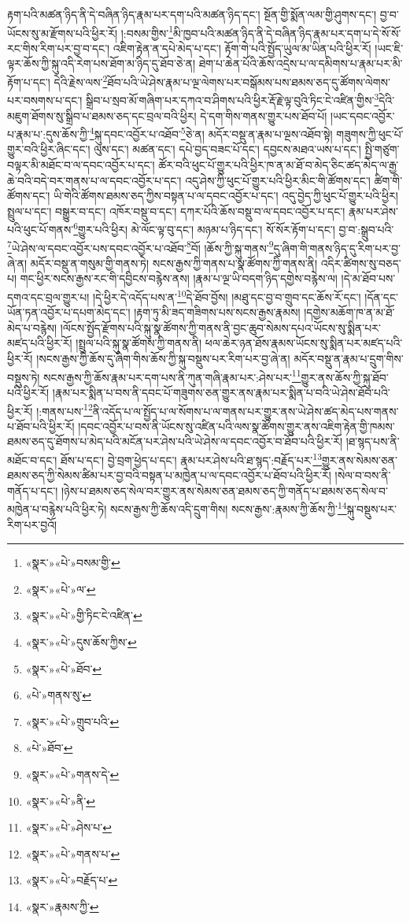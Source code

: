 རྟག་པའི་མཚན་ཉིད་ནི་དེ་བཞིན་ཉིད་རྣམ་པར་དག་པའི་མཚན་ཉིད་དང་། སྔོན་གྱི་སྨོན་ལམ་གྱི་ཤུགས་དང་། བྱ་བ་ཡོངས་སུ་མ་རྫོགས་པའི་ཕྱིར་རོ། །:བསམ་གྱིས་\footnote{«སྣར་»«པེ་»བསམ་གྱི་}མི་ཁྱབ་པའི་མཚན་ཉིད་ནི་དེ་བཞིན་ཉིད་རྣམ་པར་དག་པ་དེ་སོ་སོ་རང་གིས་རིག་པར་བྱ་བ་དང་། འཇིག་རྟེན་ན་དཔེ་མེད་པ་དང་། རྟོག་གེ་པའི་སྤྱོད་ཡུལ་མ་ཡིན་པའི་ཕྱིར་རོ། །ཡང་ཇི་ལྟར་ཆོས་ཀྱི་སྐུ་འདི་རེག་པས་ཐོག་མ་ཉིད་དུ་ཐོབ་ཅེ་ན། ཐེག་པ་ཆེན་པོའི་ཆོས་འདྲེས་པ་ལ་དམིགས་པ་རྣམ་པར་མི་རྟོག་པ་དང་། དེའི་རྗེས་ལས་\footnote{«སྣར་»«པེ་»ལ་}ཐོབ་པའི་ཡེ་ཤེས་རྣམ་པ་ལྔ་ལེགས་པར་བསྒོམས་པས་ཐམས་ཅད་དུ་ཚོགས་ལེགས་པར་བསགས་པ་དང་། སྒྲིབ་པ་སྲབ་མོ་གཞིག་པར་དཀའ་བ་ཤིགས་པའི་ཕྱིར་རྡོ་རྗེ་ལྟ་བུའི་ཏིང་ངེ་འཛིན་གྱིས་\footnote{«སྣར་»«པེ་»གྱི་ཏིང་ངེ་འཛིན་}དེའི་མཇུག་ཐོགས་སུ་སྒྲིབ་པ་ཐམས་ཅད་དང་བྲལ་བའི་ཕྱིར། དེ་དག་གིས་གནས་གྱུར་པས་ཐོབ་པོ། །ཡང་དབང་འབྱོར་པ་རྣམ་པ་:དུས་ཆོས་ཀྱི་\footnote{«སྣར་»«པེ་»དུས་ཆོས་ཀྱིས་}སྐུ་དབང་འབྱོར་པ་འཐོབ་\footnote{«སྣར་»«པེ་»ཐོབ་}ཅེ་ན། མདོར་བསྡུ་ན་རྣམ་པ་ལྔས་འཐོབ་སྟེ། གཟུགས་ཀྱི་ཕུང་པོ་གྱུར་བའི་ཕྱིར་ཞིང་དང་། ལུས་དང་། མཚན་དང་། དཔེ་བྱད་བཟང་པོ་དང་། དབྱངས་མཐའ་ཡས་པ་དང་། སྤྱི་གཙུག་བལྟར་མི་མཐོང་བ་ལ་དབང་འབྱོར་པ་དང་། ཚོར་བའི་ཕུང་པོ་གྱུར་པའི་ཕྱིར་ཁ་ན་མ་ཐོ་བ་མེད་ཅིང་ཚད་མེད་ལ་རྒྱ་ཆེ་བའི་བདེ་བར་གནས་པ་ལ་དབང་འབྱོར་པ་དང་། འདུ་ཤེས་ཀྱི་ཕུང་པོ་གྱུར་པའི་ཕྱིར་མིང་གི་ཚོགས་དང་། ཚིག་གི་ཚོགས་དང་། ཡི་གེའི་ཚོགས་ཐམས་ཅད་ཀྱིས་བསྟན་པ་ལ་དབང་འབྱོར་པ་དང་། འདུ་བྱེད་ཀྱི་ཕུང་པོ་གྱུར་པའི་ཕྱིར། སྤྲུལ་པ་དང་། བསྒྱུར་བ་དང་། འཁོར་བསྡུ་བ་དང་། དཀར་པོའི་ཆོས་བསྡུ་བ་ལ་དབང་འབྱོར་པ་དང་། རྣམ་པར་ཤེས་པའི་ཕུང་པོ་གནས་\footnote{«པེ་»གནས་སུ་}གྱུར་པའི་ཕྱིར། མེ་ལོང་ལྟ་བུ་དང་། མཉམ་པ་ཉིད་དང་། སོ་སོར་རྟོག་པ་དང་། བྱ་བ་:སྒྲུབ་པའི་\footnote{«སྣར་»«པེ་»གྲུབ་པའི་}ཡེ་ཤེས་ལ་དབང་འབྱོར་པས་དབང་འབྱོར་པ་འཐོབ་\footnote{«པེ་»ཐོབ་}བོ། །ཆོས་ཀྱི་སྐུ་གནས་\footnote{«སྣར་»«པེ་»གནས་དེ་}དུ་ཞིག་གི་གནས་ཉིད་དུ་རིག་པར་བྱ་ཞེ་ན། མདོར་བསྡུ་ན་གསུམ་གྱི་གནས་ཏེ། སངས་རྒྱས་ཀྱི་གནས་པ་སྣ་ཚོགས་ཀྱི་གནས་ནི། འདིར་ཚིགས་སུ་བཅད་པ། གང་ཕྱིར་སངས་རྒྱས་རང་གི་དབྱིངས་བརྙེས་ནས། །རྣམ་པ་ལྔ་ཡི་བདག་ཉིད་དགྱེས་བརྙེས་ལ། །དེ་མ་ཐོབ་པས་དགའ་དང་བྲལ་གྱུར་པ། །དེ་ཕྱིར་དེ་འདོད་པས་ན་\footnote{«སྣར་»«པེ་»ནི་}དེ་ཐོབ་བྱོས། །མཐུ་དང་བྱ་བ་གྲུབ་དང་ཆོས་རོ་དང་། །དོན་དང་ཡོན་ཏན་འབྱོར་པ་དཔག་མེད་དང་། །རྟག་ཏུ་མི་ཟད་གཟིགས་པས་སངས་རྒྱས་རྣམས། །དགྱེས་མཆོག་ཁ་ན་མ་ཐོ་མེད་པ་བརྙེས། །ལོངས་སྤྱོད་རྫོགས་པའི་སྐུ་སྣ་ཚོགས་ཀྱི་གནས་ནི་བྱང་ཆུབ་སེམས་དཔའ་ཡོངས་སུ་སྨིན་པར་མཛད་པའི་ཕྱིར་རོ། །སྤྲུལ་པའི་སྐུ་སྣ་ཚོགས་ཀྱི་གནས་ནི། ཕལ་ཆེར་ཉན་ཐོས་རྣམས་ཡོངས་སུ་སྨིན་པར་མཛད་པའི་ཕྱིར་རོ། །སངས་རྒྱས་ཀྱི་ཆོས་དུ་ཞིག་གིས་ཆོས་ཀྱི་སྐུ་བསྡུས་པར་རིག་པར་བྱ་ཞེ་ན། མདོར་བསྡུ་ན་རྣམ་པ་དྲུག་གིས་བསྡུས་ཏེ། སངས་རྒྱས་ཀྱི་ཆོས་རྣམ་པར་དག་པས་ནི་ཀུན་གཞི་རྣམ་པར་:ཤེས་པར་\footnote{«སྣར་»«པེ་»ཤེས་པ་}གྱུར་ནས་ཆོས་ཀྱི་སྐུ་ཐོབ་པའི་ཕྱིར་རོ། །རྣམ་པར་སྨིན་པ་བས་ནི་དབང་པོ་གཟུགས་ཅན་གྱུར་ནས་རྣམ་པར་སྨིན་པ་བའི་ཡེ་ཤེས་ཐོབ་པའི་ཕྱིར་རོ། །:གནས་པས་\footnote{«སྣར་»«པེ་»གནས་པ་}ནི་འདོད་པ་ལ་སྤྱོད་པ་ལ་སོགས་པ་ལ་གནས་པར་གྱུར་ནས་ཡེ་ཤེས་ཚད་མེད་པས་གནས་པ་ཐོབ་པའི་ཕྱིར་རོ། །དབང་འབྱོར་པ་བས་ནི་ཡོངས་སུ་འཛིན་པའི་ལས་སྣ་ཚོགས་གྱུར་ནས་འཇིག་རྟེན་གྱི་ཁམས་ཐམས་ཅད་དུ་ཐོགས་པ་མེད་པའི་མངོན་པར་ཤེས་པའི་ཡེ་ཤེས་ལ་དབང་འབྱོར་བ་ཐོབ་པའི་ཕྱིར་རོ། །ཐ་སྙད་པས་ནི་མཐོང་བ་དང་། ཐོས་པ་དང་། བྱེ་བྲག་ཕྱེད་པ་དང་། རྣམ་པར་ཤེས་པའི་ཐ་སྙད་:བརྗོད་པར་\footnote{«སྣར་»«པེ་»བརྗོད་པ་}གྱུར་ནས་སེམས་ཅན་ཐམས་ཅད་ཀྱི་སེམས་ཚིམ་པར་བྱ་བའི་བསྟན་པ་མཁྱེན་པ་ལ་དབང་འབྱོར་པ་ཐོབ་པའི་ཕྱིར་རོ། །སེལ་བ་བས་ནི་གནོད་པ་དང་། །ཉེས་པ་ཐམས་ཅད་སེལ་བར་གྱུར་ནས་སེམས་ཅན་ཐམས་ཅད་ཀྱི་གནོད་པ་ཐམས་ཅད་སེལ་བ་མཁྱེན་པ་བརྙེས་པའི་ཕྱིར་ཏེ། སངས་རྒྱས་ཀྱི་ཆོས་འདི་དྲུག་གིས། སངས་རྒྱས་:རྣམས་ཀྱི་ཆོས་ཀྱི་\footnote{«སྣར་»རྣམས་ཀྱི་}སྐུ་བསྡུས་པར་རིག་པར་བྱའོ། 